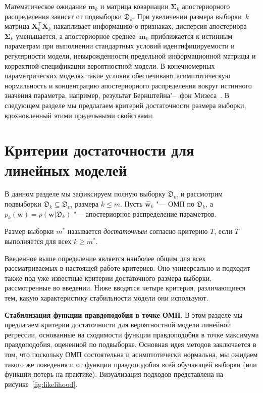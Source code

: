 Математическое ожидание $\mathbf{m}_k$ и матрица ковариации $\boldsymbol{\Sigma}_k$ апостериорного распределения зависят от подвыборки $\mathfrak{D}_k$. При увеличении размера выборки~$k$ матрица $\mathbf{X}_k^\top \mathbf{X}_k$ накапливает информацию о признаках, дисперсия апостериора~$\boldsymbol{\Sigma}_k$ уменьшается, а апостериорное среднее~$\mathbf{m}_k$ приближается к истинным параметрам при выполнении стандартных условий идентифицируемости и регулярности модели, невырожденности предельной информационной матрицы и корректной спецификации вероятностной модели. В конечномерных параметрических моделях такие условия обеспечивают асимптотическую нормальность и концентрацию апостериорного распределения вокруг истинного значения параметра, например, результат Бернштейна"--~фон Мизеса~\cite{vandervaart1998,kleijn2012bvmmisspecified}. В следующем разделе мы предлагаем критерий достаточности размера выборки, вдохновленный этими предельными свойствами. 

\section{Критерии достаточности для линейных моделей}

В данном разделе мы зафиксируем полную выборку $\mathfrak{D}_m$ и рассмотрим подвыборки $\mathfrak{D}_k \subseteq \mathfrak{D}_m$ размера $k \leqslant m$. Пусть $\hat{\mathbf{w}}_k$ "--- ОМП по $\mathfrak{D}_k$, а $p_k(\mathbf{w}) = p(\mathbf{w} | \mathfrak{D}_k)$ "--- апостериорное распределение параметров.

\begin{definition}
    Размер выборки $m^*$ называется \emph{достаточным} согласно критерию $T$, если $T$ выполняется для всех $k \geqslant m^*$.
\end{definition}

Введенное выше определение является наиболее общим для всех рассматриваемых в настоящей работе критериев. Оно универсально и подходит также под уже известные критерии достаточного размера выборки, рассмотренные во введении. Ниже вводятся четыре критерия, различающиеся тем, какую характеристику стабильности модели они используют.

\textbf{Стабилизация функции правдоподобия в точке ОМП.} В этом разделе мы предлагаем критерии достаточности для вероятностной модели линейной регрессии, основанные на сходимости функции правдоподобия в точке максимума правдоподобия, оцененной по подвыборке. Основная идея методов заключается в том, что поскольку ОМП состоятельна и асимптотически нормальна, мы ожидаем такого же поведения и от функции правдоподобия всей обучающей выборки (или функции потерь на практике). Визуализация подходов представлена на рисунке~\ref{fig:likelihood}.

